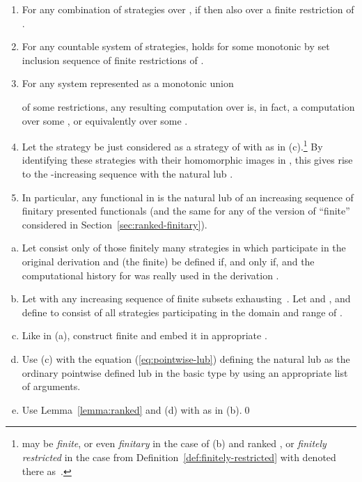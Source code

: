 \documentclass[fleqn]{LMCS}
\theoremstyle{plain}\newtheorem{satz}[thm]{Satz}
\theoremstyle{plain}\newtheorem{hyp}[thm]{Hypothesis}
\theoremstyle{plain}\newtheorem{hyps}[thm]{Hypotheses}
\theoremstyle{definition}\newtheorem{note}[thm]{Note}
\newcommand{\?}{\mbox{?}}
\begin{document}
\begin{lem}\label{lemma:computations-finitary}\hfill
\begin{enumerate}[\em(a)]
\item For any combination of strategies  over 
, 
if  then also  over a 
finite restriction  of . 

\item For any countable 
system of strategies,  holds 
for some monotonic by set inclusion sequence of finite restrictions of .

\item For any system represented as a monotonic union 
  
 of some 
restrictions, 
any resulting computation  over  is, in fact, 
a computation over some , or equivalently 
over some . 

\item Let the strategy  be just  considered as a strategy 
of  with  as in (c).\footnote{ may be \emph{finite}, or even 
\emph{finitary} in the case of (b) and ranked , 
or \emph{finitely restricted} in the case 
 from 
Definition~\ref{def:finitely-restricted} 
with  denoted there as~.
} 
By identifying these strategies with their homomorphic images 
in , this gives rise to the -increasing sequence  with the 
natural lub . 

\item In particular, any functional in  is the natural lub of an increasing sequence of 
finitary presented functionals (and the same for any of the version of ``finite'' considered in Section~\ref{sec:ranked-finitary}). 
\end{enumerate}
\end{lem}
\proof\hfill
\begin{enumerate}[(a)]
\item Let  consist only of those finitely many strategies in  which 
participate in the original derivation  and 
(the finite)  be defined if, and only if,  and 
the computational history  for  
was really used in the derivation . 

\item Let  with  any increasing sequence of finite subsets exhausting~. 
Let  and 
, and define  
to consist of all strategies 
participating in the domain and range of . 

\item Like in (a), construct finite  and embed it in appropriate 
. 

\item Use (c) with the equation (\ref{eq:pointwise-lub}) 
defining the natural lub as the ordinary 
pointwise defined lub  in the basic type 
by using an appropriate list of arguments. 

\item Use Lemma~\ref{lemma:ranked} and (d) with  as in (b).\qed
\end{enumerate}
\end{document}
